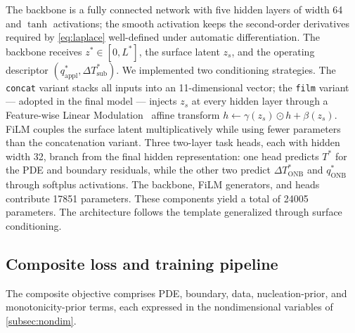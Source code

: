 The backbone is a fully connected network with five hidden layers of
width \num{64} and $\tanh$ activations; the smooth activation keeps
the second-order derivatives required by \cref{eq:laplace} well-defined
under automatic differentiation. The backbone receives
$z^{*} \in [0,L^{*}]$, the surface latent $z_s$, and the operating
descriptor $(q^{*}_{\mathrm{appl}}, \Delta T^{*}_{\mathrm{sub}})$. We
implemented two conditioning strategies. The \texttt{concat} variant
stacks all inputs into an \num{11}-dimensional vector; the
\texttt{film} variant --- adopted in the final model --- injects $z_s$
at every hidden layer through a Feature-wise Linear
Modulation~\citep{perez2018film} affine transform
$h \leftarrow \gamma(z_s)\odot h + \beta(z_s)$. FiLM couples the
surface latent multiplicatively while using fewer parameters than the
concatenation variant. Three two-layer task heads, each with hidden
width \num{32}, branch from the final hidden representation: one head
predicts $T^{*}$ for the PDE and boundary residuals, while the other
two predict $\Delta T^{*}_{\mathrm{ONB}}$ and $q^{*}_{\mathrm{ONB}}$
through softplus activations. The backbone, FiLM generators, and heads
contribute \num{17851} parameters. These components yield a total of \num{24005} parameters. The architecture follows the
\citet{raissi2019} template generalized through surface conditioning.

\subsection{Composite loss and training pipeline}\label{subsec:loss_training}\label{subsec:loss}\label{subsec:phases}\label{subsec:impl}

The composite objective comprises PDE, boundary, data, nucleation-prior,
and monotonicity-prior terms, each expressed in the nondimensional
variables of \cref{subsec:nondim}.

